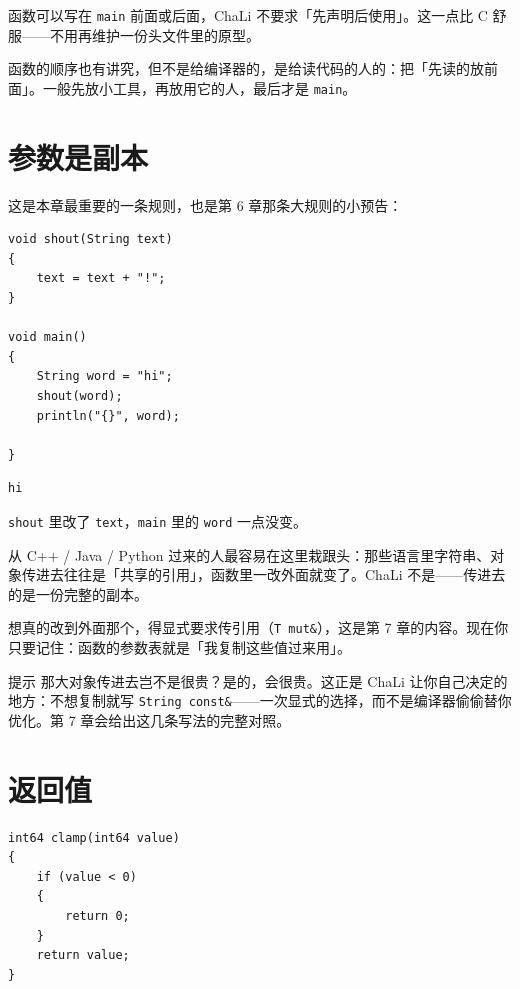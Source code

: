 函数可以写在 \texttt{main} 前面或后面，ChaLi 不要求「先声明后使用」。这一点比 C 舒服——不用再维护一份头文件里的原型。

函数的顺序也有讲究，但不是给编译器的，是给读代码的人的：把「先读的放前面」。一般先放小工具，再放用它的人，最后才是 \texttt{main}。

\section{参数是副本}

这是本章最重要的一条规则，也是第 6 章那条大规则的小预告：

\par
\medskip
\begin{lstlisting}[style=chali]
void shout(String text)
{
    text = text + "!";
}

void main()
{
    String word = "hi";
    shout(word);
    println("{}", word);

}
\end{lstlisting}
\par
\medskip

\par
\medskip
\begin{lstlisting}[style=out]
hi
\end{lstlisting}
\par
\medskip

\texttt{shout} 里改了 \texttt{text}，\texttt{main} 里的 \texttt{word} 一点没变。

从 C++ / Java / Python 过来的人最容易在这里栽跟头：那些语言里字符串、对象传进去往往是「共享的引用」，函数里一改外面就变了。ChaLi 不是——传进去的是一份完整的副本。

想真的改到外面那个，得显式要求传引用（\texttt{T mut\&}），这是第 7 章的内容。现在你只要记住：函数的参数表就是「我复制这些值过来用」。

\begin{tip}{提示}
那大对象传进去岂不是很贵？是的，会很贵。这正是 ChaLi 让你自己决定的地方：不想复制就写 \texttt{String const\&}——一次显式的选择，而不是编译器偷偷替你优化。第 7 章会给出这几条写法的完整对照。
\end{tip}

\section{返回值}

\par
\medskip
\begin{lstlisting}[style=chali]
int64 clamp(int64 value)
{
    if (value < 0)
    {
        return 0;
    }
    return value;
}
\end{lstlisting}
\par
\medskip

